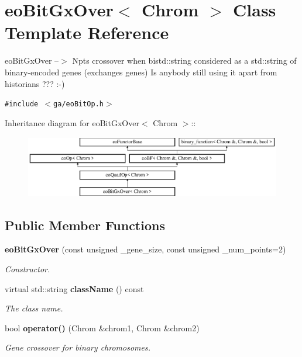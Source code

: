 \section{eo\-Bit\-Gx\-Over$<$ Chrom $>$ Class Template Reference}
\label{classeo_bit_gx_over}
eo\-Bit\-Gx\-Over --$>$ Npts crossover when bistd::string considered as a std::string of binary-encoded genes (exchanges genes) Is anybody still using it apart from historians ??? :-)  


{\tt \#include $<$ga/eo\-Bit\-Op.h$>$}

Inheritance diagram for eo\-Bit\-Gx\-Over$<$ Chrom $>$::\begin{figure}[H]
\begin{center}
\leavevmode
\includegraphics[height=2.70531cm]{classeo_bit_gx_over}
\end{center}
\end{figure}
\subsection*{Public Member Functions}
\begin{CompactItemize}
\item 
{\bf eo\-Bit\-Gx\-Over} (const unsigned \_\-gene\_\-size, const unsigned \_\-num\_\-points=2)\label{classeo_bit_gx_over_a0}

\begin{CompactList}\small\item\em Constructor. \item\end{CompactList}\item 
virtual std::string {\bf class\-Name} () const \label{classeo_bit_gx_over_a1}

\begin{CompactList}\small\item\em The class name. \item\end{CompactList}\item 
bool {\bf operator()} (Chrom \&chrom1, Chrom \&chrom2)
\begin{CompactList}\small\item\em Gene crossover for binary chromosomes. \item\end{CompactList}\end{CompactItemize}
